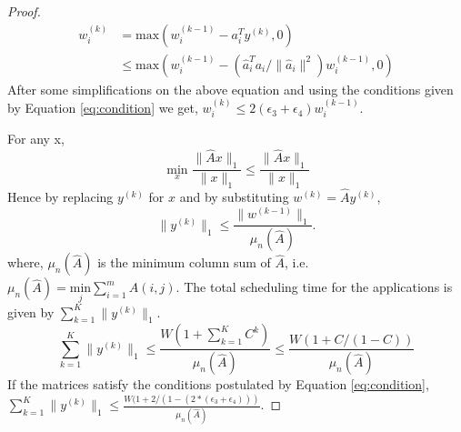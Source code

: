 \begin{proof}
\begin{align*} 
w_i^{(k)} &= \text{max}(w_i^{(k-1)} -  a_i^T y^{(k)},0)\\ 		 
		  &\leq \text{max}(w_i^{(k-1)} -   ( \hat{a}_i^{T} a_i /\|\hat{a}_i\|^2) w_i^{(k-1)} ,0)
\end{align*}  
After some simplifications on the above equation and using the conditions given by Equation \eqref{eq:condition} we get, $w_i^{(k)} \leq 2(\epsilon_3+\epsilon_4) w_i^{(k-1)}$.


For any x,
	$$
		\min_x \frac{\| \hat{A}x\|_1}{\| x\|_1} \leq \frac{\| \hat{A}x\|_1}{\| x\|_1} 
	$$
	Hence by replacing $y^{(k)}$ for $x$ and by substituting $w^{(k)}=\hat{A}y^{(k)}$,	
	$$
	\| y^{(k)}\|_1   \leq \frac{\| w^{(k-1)}\|_1 }{\mu_n(\hat{A})}.
	$$
where, $\mu_n(\hat{A})$ is the minimum column sum of $\hat{A}$, i.e. $\mu_n(\hat{A}) = \underset{j}{\text{min}}\sum_{i=1}^m A(i,j)$. The total scheduling time for the applications is given by $\sum_{k=1}^K \|y^{(k)}\|_1$.
\begin{equation}
\sum_{k=1}^K \|y^{(k)}\|_1 \leq \frac{W (1+ \sum_{k=1}^K C^{k}) }{\mu_n(\hat{A})} \leq \frac{W(1 + C/(1-C)) }{\mu_n(\hat{A})}
\end{equation}
If the matrices satisfy the conditions postulated by Equation \eqref{eq:condition}, $\sum_{k=1}^K \|y^{(k)}\|_1 \leq \frac{W(1 + 2/(1-(2*(\epsilon_3+\epsilon_4))) }{\mu_n(\hat{A})}$.

\end{proof}

